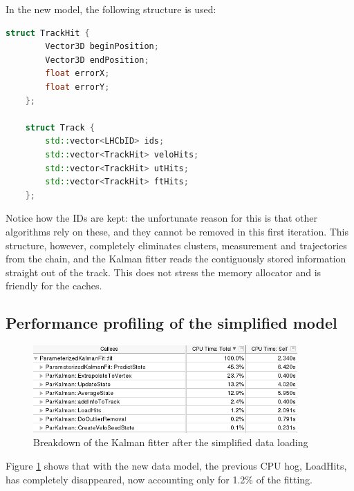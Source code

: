 \documentclass[12pt]{article}
\begin{document}
In the new model, the following structure is used:
\begin{lstlisting}[language=C++]
	struct TrackHit {
		Vector3D beginPosition;
		Vector3D endPosition;
		float errorX;
		float errorY;
	};
	
	struct Track {
		std::vector<LHCbID> ids;
		std::vector<TrackHit> veloHits;
		std::vector<TrackHit> utHits;
		std::vector<TrackHit> ftHits;
	};
\end{lstlisting}

Notice how the IDs are kept: the unfortunate reason for this is that other algorithms rely on these, and they cannot be removed in this first iteration. This structure, however, completely eliminates clusters, measurement and trajectories from the chain, and the Kalman fitter reads the contiguously stored information straight out of the track. This does not stress the memory allocator and is friendly for the caches.


\subsection{Performance profiling of the simplified model}

\begin{figure}[H]
	\begin{center}
		\includegraphics[width=0.9\textwidth]{kalmanfit_simplified_overall_breakdown}
	\end{center}
	\caption{Breakdown of the Kalman fitter after the simplified data loading}
	\label{fig_kalmanfit_simplified_overall_breakdown}
\end{figure}

Figure \ref{fig_kalmanfit_simplified_overall_breakdown} shows that with the new data model, the previous CPU hog, LoadHits, has completely disappeared, now accounting only for 1.2\% of the fitting.
\end{document}
